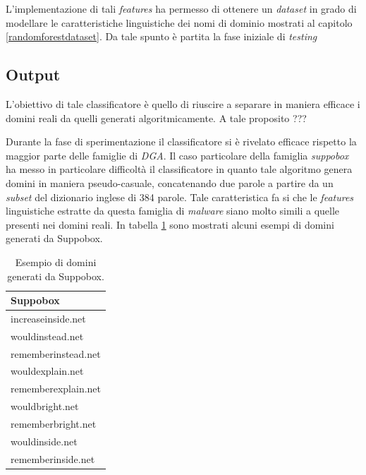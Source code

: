 L'implementazione di tali \textit{features} ha permesso di ottenere un \textit{dataset} in grado di modellare le caratteristiche linguistiche dei nomi di dominio mostrati al capitolo \ref{randomforestdataset}. Da tale spunto è partita la fase iniziale di \textit{testing} 

\subsection{Output}
\label{randomforestoutput}
L'obiettivo di tale classificatore è quello di riuscire a separare in maniera efficace i domini reali da quelli generati algoritmicamente. A tale proposito ???

Durante la fase di sperimentazione il classificatore si è rivelato efficace rispetto la maggior parte delle famiglie di \textit{DGA}. Il caso particolare della famiglia \textit{suppobox} \cite{geffner2013end} ha messo in particolare difficoltà il classificatore in quanto tale algoritmo genera domini in maniera pseudo-casuale, concatenando due parole a partire da un \textit{subset} del dizionario inglese di 384 parole. Tale caratteristica fa si che le \textit{features} linguistiche estratte da questa famiglia di \textit{malware} siano molto simili a quelle presenti nei domini reali. In tabella \ref{tab:suppobox} sono mostrati alcuni esempi di domini generati da Suppobox.


\begin{table}[htb]
    \centering
    \begin{tabular}{|l|}
        \hline
        Suppobox
        \\
        \hline
        \hline
       	increaseinside.net \\
		wouldinstead.net \\
		rememberinstead.net \\
		wouldexplain.net \\
		rememberexplain.net \\
		wouldbright.net \\
		rememberbright.net \\
		wouldinside.net \\
		rememberinside.net \\
        \hline
    \end{tabular}
    \caption{Esempio di domini generati da Suppobox.}
\label{tab:suppobox}
\end{table}

